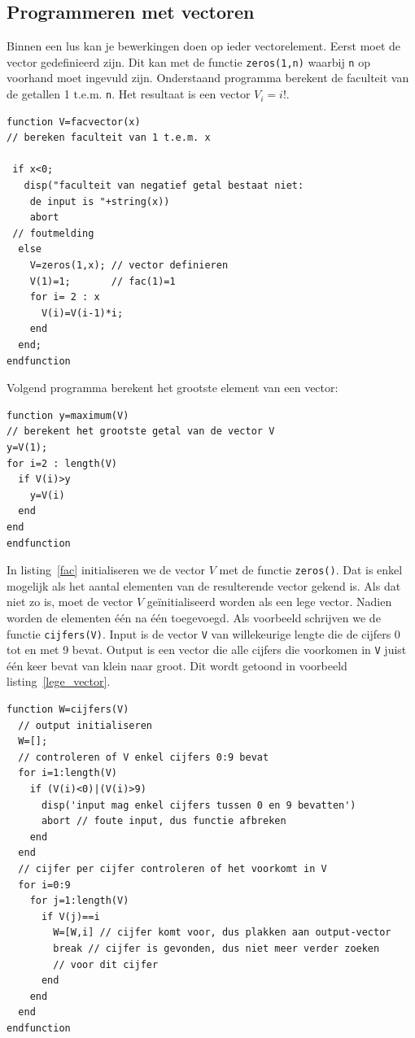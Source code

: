 \subsection{Programmeren met vectoren}

Binnen een lus kan je bewerkingen doen op ieder vectorelement. Eerst moet de vector gedefinieerd zijn. Dit kan met de functie \verb+zeros(1,n)+ waarbij \verb+n+ op voorhand moet ingevuld zijn. Onderstaand programma berekent de faculteit van de getallen 1 t.e.m. \verb+n+. Het resultaat is een vector $V_{i} = i!$.

\begin{lstlisting}[caption={Bereken faculteit van 1 t.e.m. x}, label=fac]
function V=facvector(x)
// bereken faculteit van 1 t.e.m. x
 
 if x<0; 
   disp("faculteit van negatief getal bestaat niet: 
   	de input is "+string(x))
    abort 
 // foutmelding
  else
    V=zeros(1,x); // vector definieren
    V(1)=1;       // fac(1)=1
    for i= 2 : x
      V(i)=V(i-1)*i;
    end
  end;
endfunction
\end{lstlisting}

Volgend programma berekent het grootste element van een vector:

\begin{lstlisting}[caption={Maximum van een vector}, label=maximum]
function y=maximum(V)
// berekent het grootste getal van de vector V
y=V(1);
for i=2 : length(V)
  if V(i)>y
    y=V(i)
  end
end
endfunction
\end{lstlisting}

In listing~\ref{fac} initialiseren we de vector $V$ met de functie \verb/zeros()/. Dat is enkel mogelijk als het aantal elementen van de resulterende vector gekend is. Als dat niet zo is, moet de vector $V$ geïnitialiseerd worden als een lege vector. Nadien worden de elementen één na één toegevoegd. Als voorbeeld schrijven we de functie \verb/cijfers(V)/. Input is de vector \verb+V+ van willekeurige lengte die de cijfers 0 tot en met 9 bevat. Output is een vector die alle cijfers die voorkomen in \verb/V/ juist één keer bevat van klein naar groot.
Dit wordt getoond in voorbeeld listing~\ref{lege_vector}.

\begin{lstlisting}[caption={Een vector aanmaken gedurende de functie}, label=lege_vector]
function W=cijfers(V)
  // output initialiseren
  W=[];
  // controleren of V enkel cijfers 0:9 bevat
  for i=1:length(V)
    if (V(i)<0)|(V(i)>9)
      disp('input mag enkel cijfers tussen 0 en 9 bevatten')
      abort // foute input, dus functie afbreken
    end
  end
  // cijfer per cijfer controleren of het voorkomt in V
  for i=0:9
    for j=1:length(V)
      if V(j)==i
        W=[W,i] // cijfer komt voor, dus plakken aan output-vector
        break // cijfer is gevonden, dus niet meer verder zoeken
        // voor dit cijfer
      end
    end
  end
endfunction
\end{lstlisting}

